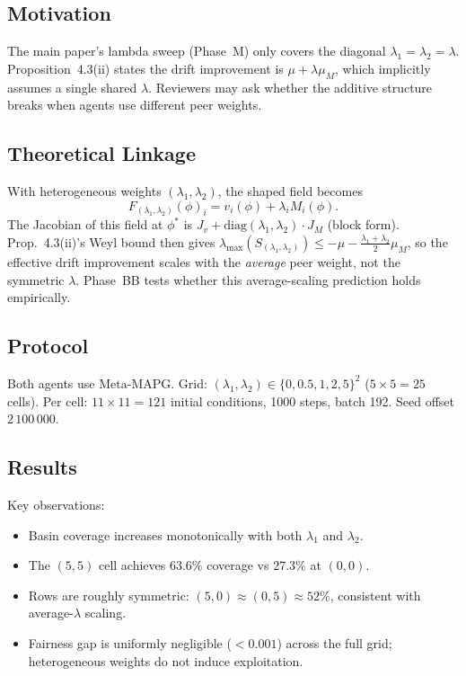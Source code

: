 \documentclass[11pt,a4paper]{article}
\begin{document}
\subsection{Motivation}

The main paper's lambda sweep (Phase~M) only covers the diagonal
$\lambda_1=\lambda_2=\lambda$. Proposition~4.3(ii) states the drift improvement
is $\mu+\lambda\mu_M$, which implicitly assumes a single shared $\lambda$.
Reviewers may ask whether the additive structure breaks when agents use
different peer weights.

\subsection{Theoretical Linkage}

With heterogeneous weights $(\lambda_1,\lambda_2)$, the shaped field becomes
\[
  F_{(\lambda_1,\lambda_2)}(\phi)_i = v_i(\phi)+\lambda_i M_i(\phi).
\]
The Jacobian of this field at $\phi^*$ is $J_v + \text{diag}(\lambda_1,\lambda_2)\cdot J_M$
(block form). Prop.~4.3(ii)'s Weyl bound then gives
$\lambda_{\max}(S_{(\lambda_1,\lambda_2)}) \leq -\mu - \frac{\lambda_1+\lambda_2}{2}\mu_M$,
so the effective drift improvement scales with the \emph{average} peer weight,
not the symmetric $\lambda$. Phase~BB tests whether this average-scaling
prediction holds empirically.

\subsection{Protocol}

Both agents use Meta-MAPG. Grid: $(\lambda_1,\lambda_2)\in\{0,0.5,1,2,5\}^2$
($5\times5=25$ cells). Per cell: $11\times11=121$ initial conditions,
1000 steps, batch 192. Seed offset $2\,100\,000$.

\subsection{Results}



Key observations:
\begin{itemize}
\item Basin coverage increases monotonically with both $\lambda_1$ and $\lambda_2$.
\item The $(5,5)$ cell achieves $63.6\%$ coverage vs $27.3\%$ at $(0,0)$.
\item Rows are roughly symmetric: $(5,0)\approx(0,5)\approx52\%$, consistent
  with average-$\lambda$ scaling.
\item Fairness gap is uniformly negligible ($<0.001$) across the full grid;
  heterogeneous weights do not induce exploitation.
\end{itemize}
\end{document}
